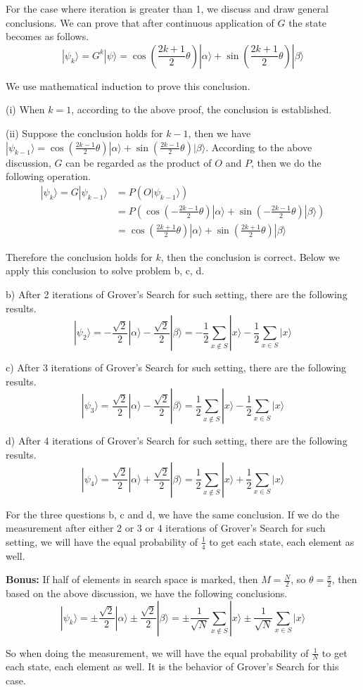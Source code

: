 \documentclass[11pt]{article}
\begin{document}
For the case where iteration is greater than 1, we discuss and draw general conclusions.  We can prove that after continuous application of $G$ the state becomes as follows.
$$
|\psi_k\rangle=G^k|\psi\rangle=\cos(\frac{2k+1}{2}\theta)|\alpha\rangle+\sin(\frac{2k+1}{2}\theta)|\beta\rangle
$$

We use mathematical induction to prove this conclusion.

(i) When $k=1$, according to the above proof, the conclusion is established.

(ii) Suppose the conclusion holds for $k-1$, then we have $|\psi_{k-1}\rangle=\cos(\frac{2k-1}{2}\theta)|\alpha\rangle+\sin(\frac{2k-1}{2}\theta)|\beta\rangle$. According to the above discussion, $G$ can be regarded as the product of $O$ and $P$, then we do the following operation.
$$
\begin{aligned}
|\psi_k\rangle=G|\psi_{k-1}\rangle&=P(O|\psi_{k-1}\rangle)\\
&=P(\cos(-\frac{2k-1}{2}\theta)|\alpha\rangle+\sin(-\frac{2k-1}{2}\theta)|\beta\rangle)\\
&=\cos(\frac{2k+1}{2}\theta)|\alpha\rangle+\sin(\frac{2k+1}{2}\theta)|\beta\rangle
\end{aligned}
$$

Therefore the conclusion holds for $k$, then the conclusion is correct. Below we apply this conclusion to solve problem b, c, d.

b) After 2 iterations of Grover’s Search for such setting, there are the following results. 
$$
|\psi_2\rangle=-\frac{\sqrt{2}}{2}|\alpha\rangle-\frac{\sqrt{2}}{2}|\beta\rangle=-\frac{1}{2}\sum_{x\notin S}|x\rangle-\frac{1}{2}\sum_{x\in S}|x\rangle
$$ 

c) After 3 iterations of Grover’s Search for such setting, there are the following results. 
$$
|\psi_3\rangle=\frac{\sqrt{2}}{2}|\alpha\rangle-\frac{\sqrt{2}}{2}|\beta\rangle=\frac{1}{2}\sum_{x\notin S}|x\rangle-\frac{1}{2}\sum_{x\in S}|x\rangle
$$

d) After 4 iterations of Grover’s Search for such setting, there are the following results. 
$$
|\psi_4\rangle=\frac{\sqrt{2}}{2}|\alpha\rangle+\frac{\sqrt{2}}{2}|\beta\rangle=\frac{1}{2}\sum_{x\notin S}|x\rangle+\frac{1}{2}\sum_{x\in S}|x\rangle
$$


For the three questions b, c and d, we have the same conclusion. If we do the measurement after either 2 or 3 or 4 iterations of Grover’s Search for such setting, we will have the equal probability of $\frac{1}{4}$ to get each state, each element as well.

\textbf{Bonus: }If half of elements in search space is marked, then $M=\frac{N}{2}$, so $\theta=\frac{\pi}{2}$, then based on the above discussion, we have the following conclusions.
$$
|\psi_k\rangle=\pm\frac{\sqrt{2}}{2}|\alpha\rangle\pm\frac{\sqrt{2}}{2}|\beta\rangle=\pm\frac{1}{\sqrt{N}}\sum_{x\notin S}|x\rangle\pm\frac{1}{\sqrt{N}}\sum_{x\in S}|x\rangle
$$

So when doing the measurement, we will have the equal probability of $\frac{1}{N}$ to get each state, each element as well. It is the behavior of Grover’s Search for this case.
\end{document}
